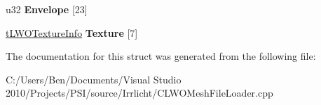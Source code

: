 \begin{DoxyCompactItemize}
\item 
\hypertarget{structirr_1_1scene_1_1_c_l_w_o_mesh_file_loader_1_1t_l_w_o_material_a5583cc63b4bc54e1f5d5126aaddb5f96}{u32 {\bfseries Envelope} \mbox{[}23\mbox{]}}\label{structirr_1_1scene_1_1_c_l_w_o_mesh_file_loader_1_1t_l_w_o_material_a5583cc63b4bc54e1f5d5126aaddb5f96}

\item 
\hypertarget{structirr_1_1scene_1_1_c_l_w_o_mesh_file_loader_1_1t_l_w_o_material_ae19043ed2b56e9161404f9a16614e3dd}{\hyperlink{structirr_1_1scene_1_1t_l_w_o_texture_info}{t\-L\-W\-O\-Texture\-Info} {\bfseries Texture} \mbox{[}7\mbox{]}}\label{structirr_1_1scene_1_1_c_l_w_o_mesh_file_loader_1_1t_l_w_o_material_ae19043ed2b56e9161404f9a16614e3dd}

\end{DoxyCompactItemize}


The documentation for this struct was generated from the following file\-:\begin{DoxyCompactItemize}
\item 
C\-:/\-Users/\-Ben/\-Documents/\-Visual Studio 2010/\-Projects/\-P\-S\-I/source/\-Irrlicht/C\-L\-W\-O\-Mesh\-File\-Loader.\-cpp\end{DoxyCompactItemize}
